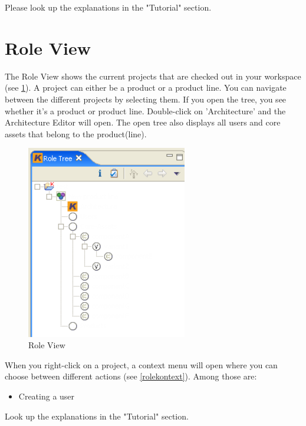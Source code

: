 Please look up the explanations in the "Tutorial" section.

\section{Role View}

The Role View shows the current projects that are checked out in your workspace 
(see \ref{roletree}).
A project can either be a product or a product line. You can navigate between the 
different projects by selecting them. If you open the tree, you see whether it's a product 
or product line. Double-click on 'Architecture' and the Architecture Editor will open. The open tree also 
displays all users and core assets that belong to the product(line).

\begin{figure}[h!]
\begin{center}
\includegraphics[width=7cm]{roletree.png}
   \caption{Role View}
\label{roletree}
\end{center}
\end{figure}\par

When you right-click on a project, a context menu will open where you can choose 
between different actions (see \ref{rolekontext}). Among those are:

\begin{itemize}
	\item Creating a user
\end{itemize}
Look up the explanations in the "Tutorial" section.

